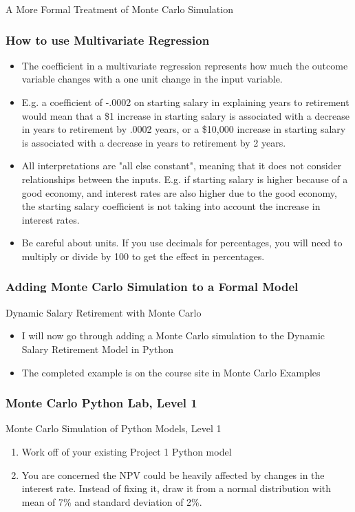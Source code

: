 \documentclass[handout, 11pt]{beamer}
\begin{document}
\begin{section}[Formal MC]{A More Formal Treatment of Monte Carlo Simulation}
\begin{frame}
\end{frame}
\begin{frame}
\frametitle{How to use Multivariate Regression}
\begin{itemize}
\small
\vfill
\item The coefficient in a multivariate regression represents how much the outcome variable changes with a one unit change in the input variable.
\vfill
\item E.g. a coefficient of -.0002 on starting salary in explaining years to retirement would mean that a \$1 increase in starting salary is associated with a decrease in years to retirement by .0002 years, or a \$10,000 increase in starting salary is associated with a decrease in years to retirement by 2 years.
\vfill
\item All interpretations are "all else constant", meaning that it does not consider relationships between the inputs. E.g. if starting salary is higher because of a good economy, and interest rates are also higher due to the good economy, the starting salary coefficient is not taking into account the increase in interest rates.
\vfill
\item Be careful about units. If you use decimals for percentages, you will need to multiply or divide by 100 to get the effect in percentages.
\end{itemize}
\end{frame}
\begin{frame}
\frametitle{Adding Monte Carlo Simulation to a Formal Model}
{
\begin{block}{Dynamic Salary Retirement with Monte Carlo}
\begin{itemize}
\item I will now go through adding a Monte Carlo simulation to the Dynamic Salary Retirement Model in Python
\item The completed example is on the course site in Monte Carlo Examples
\end{itemize}
\end{block}
}
\end{frame}
\begin{frame}
\frametitle{Monte Carlo Python Lab, Level 1}
{
\begin{block}{Monte Carlo Simulation of Python Models, Level 1}
\begin{enumerate}
\item Work off of your existing Project 1 Python model
\item You are concerned the NPV could be heavily affected by changes in the interest rate. Instead of fixing it, draw it from a normal distribution with mean of 7\% and standard deviation of 2\%.

\end{enumerate}
\end{block}}
\end{frame}
\end{section}
\end{document}
